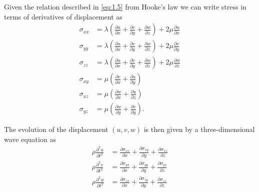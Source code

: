 \documentclass[twoside]{bsu-ms}
\begin{document}
Given the relation described in \eqref{eq:1.5} from Hooke's law we can write stress in terms of derivatives of displacement as 
\begin{subequations}
\begin{align}
    \sigma_{xx} &=\lambda\left(\frac{\partial u}{\partial x}+\frac{\partial v}{\partial y}+\frac{\partial w}{\partial z}\right)+2\mu\frac{\partial u}{\partial x} \label{eq:1.8d}\\
    \sigma_{yy} &=\lambda\left(\frac{\partial u}{\partial x}+\frac{\partial v}{\partial y}+\frac{\partial w}{\partial z}\right)+2\mu\frac{\partial v}{\partial y} \label{eq:1.8e}\\
    \sigma_{zz} &=\lambda\left(\frac{\partial u}{\partial x}+\frac{\partial v}{\partial y}+\frac{\partial w}{\partial z}\right)+2\mu\frac{\partial w}{\partial z} \label{eq:1.8f}\\
    \sigma_{xy}&=\mu\left(\frac{\partial v}{\partial x}+\frac{\partial u}{\partial y}\right) \label{eq:1.8g}\\
    \sigma_{xz}&=\mu\left(\frac{\partial w}{\partial x}+\frac{\partial u}{\partial z}\right) \label{eq:1.8h}\\
    \sigma_{yz}&=\mu\left(\frac{\partial w}{\partial y}+\frac{\partial v}{\partial y}\right). \label{eq:1.8i}
\end{align}
\label{eq:1.8}
\end{subequations}

The evolution of the displacement $(u,v,w)$ is then given by a three-dimensional wave equation as
\begin{equation}
\begin{aligned}
\rho\frac{\partial^2 u}{\partial t^2}&=\frac{\partial \sigma_{xx}}{\partial x}+\frac{\partial \sigma_{xy}}{\partial y}+\frac{\partial \sigma_{xz}}{\partial z}\\    
\rho\frac{\partial^2 v}{\partial t^2}&=\frac{\partial \sigma_{yx}}{\partial x}+\frac{\partial \sigma_{yy}}{\partial y}+\frac{\partial \sigma_{yz}}{\partial z}\\
\rho\frac{\partial^2 w}{\partial t^2}&=\frac{\partial \sigma_{zx}}{\partial x}+\frac{\partial \sigma_{zy}}{\partial y}+\frac{\partial \sigma_{zz}}{\partial z} 
\end{aligned}
\label{eq:1.9}
\end{equation}
\end{document}
